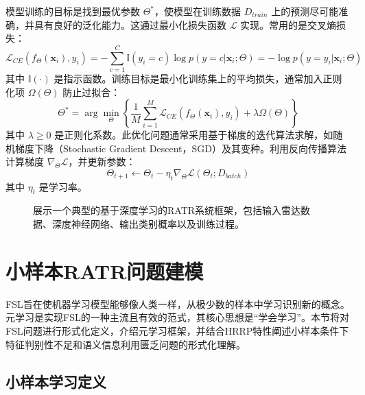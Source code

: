模型训练的目标是找到最优参数 $\Theta^*$，使模型在训练数据 $D_{train}$ 上的预测尽可能准确，并具有良好的泛化能力。这通过最小化损失函数 $\mathcal{L}$ 实现。常用的是交叉熵损失：
\begin{equation}
    \mathcal{L}_{CE}(f_\Theta(\mathbf{x}_i), y_i) = -\sum_{c=1}^{C} \mathbb{I}(y_i=c) \log p(y=c|\mathbf{x}_i; \Theta) = -\log p(y=y_i|\mathbf{x}_i; \Theta)
    \label{eq:cross_entropy_loss}
\end{equation}
其中 $\mathbb{I}(\cdot)$ 是指示函数。训练目标是最小化训练集上的平均损失，通常加入正则化项 $\Omega(\Theta)$ 防止过拟合：
\begin{equation}
    \Theta^* = \arg\min_{\Theta} \left\{ \frac{1}{M} \sum_{i=1}^{M} \mathcal{L}_{CE}(f_\Theta(\mathbf{x}_i), y_i) + \lambda \Omega(\Theta) \right\}
    \label{eq:optimization_objective}
\end{equation}
其中 $\lambda \ge 0$ 是正则化系数。此优化问题通常采用基于梯度的迭代算法求解，如随机梯度下降（Stochastic Gradient Descent，SGD）及其变种。利用反向传播算法计算梯度 $\nabla_\Theta \mathcal{L}$，并更新参数：
\begin{equation}
    \Theta_{t+1} \leftarrow \Theta_t - \eta_t \nabla_\Theta \mathcal{L}(\Theta_t; D_{batch})
    \label{eq:sgd_update}
\end{equation}
其中 $\eta_t$ 是学习率。

\begin{figure}[h!]
    \centering
    \caption{展示一个典型的基于深度学习的RATR系统框架，包括输入雷达数据、深度神经网络、输出类别概率以及训练过程。}
    \label{fig:深度学习_framework}
\end{figure}


\section{小样本RATR问题建模}
\label{sec:fsl_modeling}

FSL旨在使机器学习模型能够像人类一样，从极少数的样本中学习识别新的概念。元学习是实现FSL的一种主流且有效的范式，其核心思想是“学会学习”。本节将对FSL问题进行形式化定义，介绍元学习框架，并结合HRRP特性阐述小样本条件下特征判别性不足和语义信息利用匮乏问题的形式化理解。

\subsection{小样本学习定义}
\label{subsec:fsl_definition}

